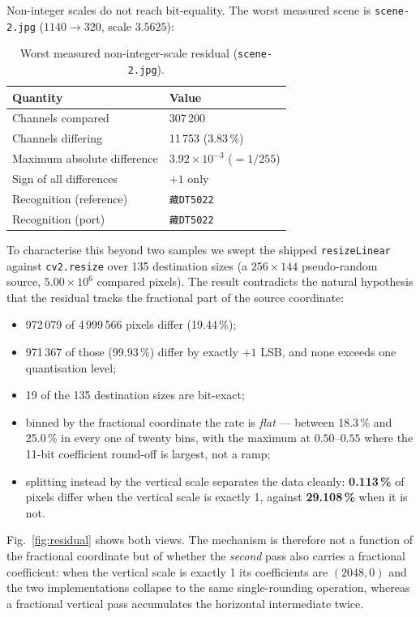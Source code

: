 \documentclass[journal]{IEEEtran}
\begin{document}
Non-integer scales do not reach bit-equality. The worst measured scene is
\texttt{scene-2.jpg} ($1140\rightarrow320$, scale $3.5625$):

\begin{table}[t]
\centering
\caption{Worst measured non-integer-scale residual (\texttt{scene-2.jpg}).}
\label{tab:residual}
\footnotesize
\begin{tabular}{@{}ll@{}}
\hline
\textbf{Quantity} & \textbf{Value}\\
\hline
Channels compared & 307\,200\\
Channels differing & 11\,753 (3.83\,\%)\\
Maximum absolute difference & $3.92\times10^{-3}$ ($=1/255$)\\
Sign of all differences & $+1$ only\\
Recognition (reference) & \texttt{藏DT5022}\\
Recognition (port) & \texttt{藏DT5022}\\
\hline
\end{tabular}
\end{table}

To characterise this beyond two samples we swept the shipped
\texttt{resizeLinear} against \texttt{cv2.resize} over 135 destination sizes
(a $256\times144$ pseudo-random source, $5.00\times10^6$ compared pixels). The
result contradicts the natural hypothesis that the residual tracks the fractional
part of the source coordinate:

\begin{itemize}
\item 972\,079 of 4\,999\,566 pixels differ (19.44\,\%);
\item 971\,367 of those (99.93\,\%) differ by exactly $+1$ LSB, and none exceeds
one quantisation level;
\item 19 of the 135 destination sizes are bit-exact;
\item binned by the fractional coordinate the rate is \emph{flat} --- between
18.3\,\% and 25.0\,\% in every one of twenty bins, with the maximum at
$0.50$--$0.55$ where the 11-bit coefficient round-off is largest, not a ramp;
\item splitting instead by the vertical scale separates the data cleanly:
\textbf{0.113\,\%} of pixels differ when the vertical scale is exactly 1, against
\textbf{29.108\,\%} when it is not.
\end{itemize}

Fig.~\ref{fig:residual} shows both views. The mechanism is therefore not a
function of the fractional coordinate but of whether the \emph{second} pass also
carries a fractional coefficient: when the vertical scale is exactly 1 its
coefficients are $(2048, 0)$ and the two implementations collapse to the same
single-rounding operation, whereas a fractional vertical pass accumulates the
horizontal intermediate twice.
\end{document}
